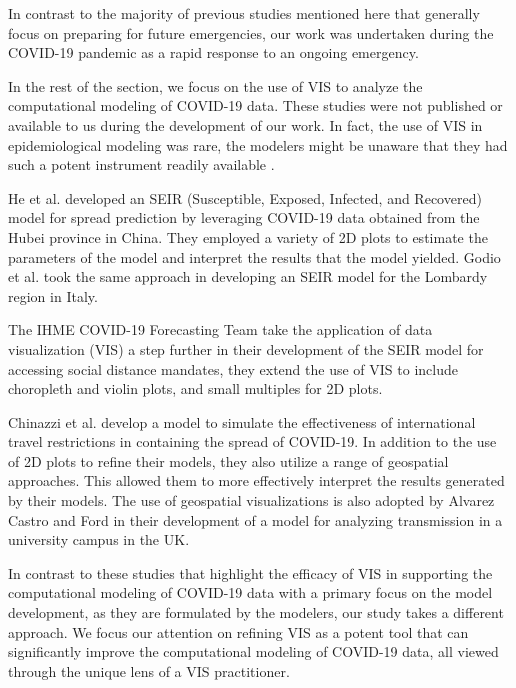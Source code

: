 In contrast to the majority of previous studies mentioned here that generally focus on preparing for future emergencies, our work was undertaken during the COVID-19 pandemic as a rapid response to an ongoing emergency.


In the rest of the section, we focus on the use of \ac{VIS} to analyze the computational modeling of COVID-19 data.
These studies were not published or available to us during the development of our work.
In fact, the use of VIS in epidemiological modeling was rare, the modelers might be unaware that they had such a potent instrument readily available \cite{chen2022RAMPVIS}.

He et al. \cite{he2020SEIR} developed an SEIR (Susceptible, Exposed, Infected, and Recovered) model for spread prediction by leveraging COVID-19 data obtained from the Hubei province in China.
They employed a variety of 2D plots to estimate the parameters of the model and interpret the results that the model yielded. Godio et al. \cite{godio2020SEIR} took the same approach in developing an SEIR model for the Lombardy region in Italy.

The IHME COVID-19 Forecasting Team \cite{ihmecovid-19forecastingteam2021Modeling} take the application of data visualization (VIS) a step further in their development of the SEIR model for accessing social distance mandates, they extend the use of \ac{VIS} to include choropleth and violin plots, and small multiples for 2D plots.

Chinazzi et al. \cite{chinazzi2020Effect} develop a model to simulate the effectiveness of international travel restrictions in containing the spread of COVID-19.
In addition to the use of 2D plots to refine their models, they also utilize a range of geospatial approaches.
This allowed them to more effectively interpret the results generated by their models.
The use of geospatial visualizations is also adopted by Alvarez Castro and Ford \cite{alvarezcastro20213D} in their development of a model for analyzing transmission in a university campus in the UK.

In contrast to these studies that highlight the efficacy of \ac{VIS} in supporting the computational modeling of COVID-19 data with a primary focus on the model development, as they are formulated by the modelers, our study takes a different approach.
We focus our attention on refining \ac{VIS} as a potent tool that can significantly improve the computational modeling of COVID-19 data, all viewed through the unique lens of a \ac{VIS} practitioner.
